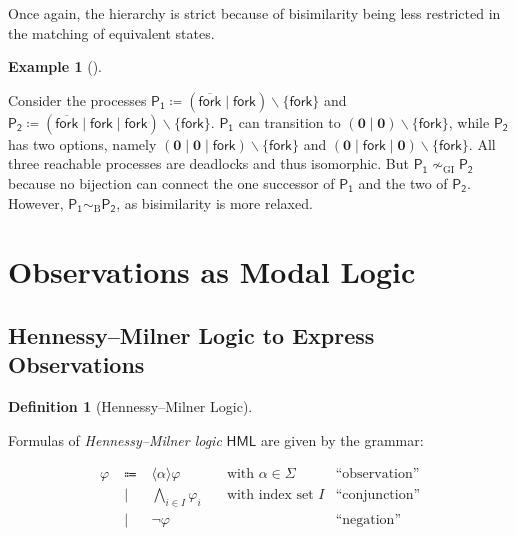 \documentclass[
  a4paper,
]{report}
\theoremstyle{plain}
\theoremstyle{plain}
\theoremstyle{definition}
\newtheorem{definition}{Definition}[section]
\theoremstyle{plain}
\theoremstyle{definition}
\newtheorem{example}{Example}[section]
\theoremstyle{remark}
\begin{document}
Once again, the hierarchy is strict because of bisimilarity being less
restricted in the matching of equivalent states.

\begin{example}[]\protect\hypertarget{exm-iso-vs-bisim}{}\label{exm-iso-vs-bisim}

Consider the processes
\(\mathsf{P_1} ≔ (\overline{\mathsf{fork}} \mid\mathsf{fork}) \mathbin{\backslash}\{\mathsf{fork}\}\)
and
\(\mathsf{P_2} ≔ (\overline{\mathsf{fork}} \mid\mathsf{fork} \mid\mathsf{fork}) \mathbin{\backslash}\{\mathsf{fork}\}\).
\(\mathsf{P_1}\) can transition to
\((\mathbf{0}\mid\mathbf{0}) \mathbin{\backslash}\{\mathsf{fork}\}\),
while \(\mathsf{P_2}\) has two options, namely
\((\mathbf{0}\mid\mathbf{0}\mid\mathsf{fork}) \mathbin{\backslash}\{\mathsf{fork}\}\)
and
\((\mathbf{0}\mid\mathsf{fork} \mid\mathbf{0}) \mathbin{\backslash}\{\mathsf{fork}\}\).
All three reachable processes are deadlocks and thus isomorphic. But
\(\mathsf{P_1} \nsim_\mathrm{GI} \mathsf{P_2}\) because no bijection can
connect the one successor of \(\mathsf{P_1}\) and the two of
\(\mathsf{P_2}\). However,
\(\mathsf{P_1} \sim_\mathrm{B} \mathsf{P_2}\), as bisimilarity is more
relaxed.

\end{example}

\section{Observations as Modal Logic}\label{sec-hml}

\subsection{Hennessy--Milner Logic to Express
Observations}\label{hennessymilner-logic-to-express-observations}

\begin{definition}[Hennessy--Milner
Logic]\protect\hypertarget{def-hml}{}\label{def-hml}

Formulas of \emph{Hennessy--Milner logic} \(\textsf{HML}\) are given by
the grammar:

\[
\begin{array}{rcllr}
  φ & \;⩴\;&
    \langle α \rangle φ & \quad\text{with } α ∈ \Sigma&
      \text{“observation”} \\
    & \;\mid\;& \textstyle\bigwedge_{i \in I}φ_i & \quad\text{with index set } I & \text{“conjunction”} \\
    & \;\mid\;& \neg φ & & \text{“negation”} \\
\end{array}
\]

\end{definition}
\end{document}
